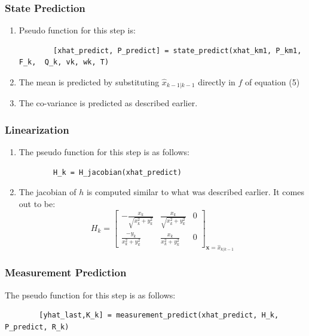 \documentclass[a4paper,11pt]{article}
\theoremstyle{mytheor}
\begin{document}
\subsubsection{State Prediction}
\begin{enumerate}
    \item 
    Pseudo function for this step is: 
     \begin{lstlisting}
        [xhat_predict, P_predict] = state_predict(xhat_km1, P_km1, F_k,  Q_k, vk, wk, T)
    \end{lstlisting}
    \item The mean is predicted by substituting $\hat{x}_{k-1|k-1}$ directly in $f$ of equation (5)
    \item The co-variance is predicted as described earlier.
    
\end{enumerate}

\subsubsection{Linearization}
\begin{enumerate}
    \item 
    The pseudo function for this step is as follows: 
    \begin{lstlisting}
        H_k = H_jacobian(xhat_predict)
    \end{lstlisting}
    
    \item The jacobian of $h$ is computed similar to what was described earlier. It comes out to be:
    \begin{equation*}
         H_k = \begin{bmatrix}
         -\frac{x_k}{\sqrt{x_k^2+y_k^2} } & \frac{x_k}{\sqrt{x_k^2+y_k^2} } & 0 \\ 
         \frac{-y_k}{x_k^2+y_k^2} & \frac{x_k}{x_k^2+y_k^2} & 0 
         \end{bmatrix}_{\mathbf{x} = \hat{x}_{k|k-1}}
    \end{equation*}
\end{enumerate}

\subsubsection{Measurement Prediction}

    The pseudo function for this step is as follows: 
    \begin{lstlisting}
        [yhat_last,K_k] = measurement_predict(xhat_predict, H_k, P_predict, R_k)
    \end{lstlisting}
    
\end{document}
